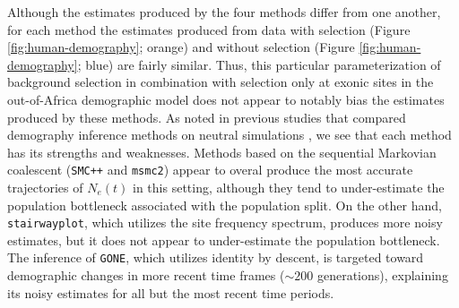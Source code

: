 \documentclass[hidelinks]{article}
\newcommand{\msmc}{\texttt{msmc2}\xspace}
\newcommand{\stairway}{\texttt{stairwayplot}\xspace}
\newcommand{\gone}{\texttt{GONE}\xspace}
\newcommand{\smcpp}{\texttt{SMC++}\xspace}
\begin{document}
    Although the estimates produced by the four methods differ from one another, 
    for each method the estimates produced from data with selection (Figure
    \ref{fig:human-demography}; orange) and without selection (Figure
    \ref{fig:human-demography}; blue) are fairly similar.
    Thus, this particular parameterization of background selection
    in combination with selection only at exonic sites in the out-of-Africa demographic model does not
    appear to notably bias the estimates produced by these methods.
    As noted in previous studies that compared demography inference methods
    on neutral simulations \citep{adrion2020community},
    we see that each method has its strengths and weaknesses.
    Methods based on the sequential Markovian coalescent (\smcpp and \msmc)
    appear to overal produce the most accurate trajectories of $N_e(t)$
    in this setting, although they tend to under-estimate the population
    bottleneck associated with the population split.
    On the other hand, \stairway, which utilizes the site frequency spectrum,
    produces more noisy estimates,
    but it does not appear to under-estimate the population bottleneck.
    The inference of \gone, which utilizes identity by descent,
    is targeted toward demographic changes in more recent time frames ($\sim 200$ generations),
    explaining its noisy estimates for all but the most recent time periods.
    
    


\end{document}
